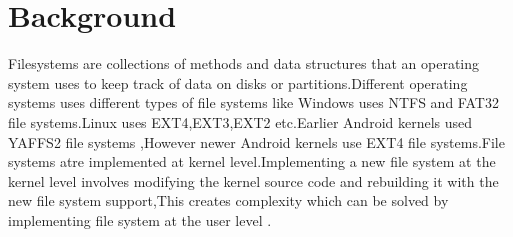 \chapter{Background}

Filesystems are collections of methods and data structures that an operating system uses to keep track of data on disks or partitions.Different operating systems uses different types of file systems like Windows uses NTFS and FAT32 file systems.Linux uses EXT4,EXT3,EXT2 etc.Earlier Android kernels used YAFFS2 file systems ,However newer Android kernels use EXT4 file systems.File systems atre implemented at kernel level.Implementing a new file system at the kernel level involves modifying the kernel source code and rebuilding it with the new file system support,This creates complexity which can be solved by implementing file system at the user level .

